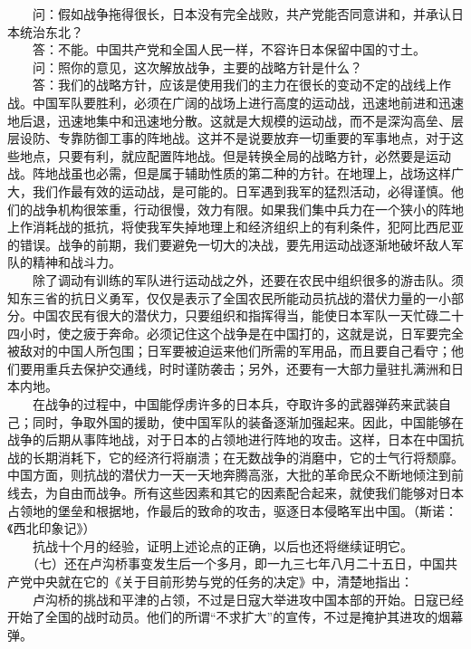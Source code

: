 \documentclass[cn,11pt,chinese]{elegantbook}
\begin{document}
　　问：假如战争拖得很长，日本没有完全战败，共产党能否同意讲和，并承认日本统治东北？\\
　　答：不能。中国共产党和全国人民一样，不容许日本保留中国的寸土。\\
　　问：照你的意见，这次解放战争，主要的战略方针是什么？\\
　　答：我们的战略方针，应该是使用我们的主力在很长的变动不定的战线上作战。中国军队要胜利，必须在广阔的战场上进行高度的运动战，迅速地前进和迅速地后退，迅速地集中和迅速地分散。这就是大规模的运动战，而不是深沟高垒、层层设防、专靠防御工事的阵地战。这并不是说要放弃一切重要的军事地点，对于这些地点，只要有利，就应配置阵地战。但是转换全局的战略方针，必然要是运动战。阵地战虽也必需，但是属于辅助性质的第二种的方针。在地理上，战场这样广大，我们作最有效的运动战，是可能的。日军遇到我军的猛烈活动，必得谨慎。他们的战争机构很笨重，行动很慢，效力有限。如果我们集中兵力在一个狭小的阵地上作消耗战的抵抗，将使我军失掉地理上和经济组织上的有利条件，犯阿比西尼亚的错误。战争的前期，我们要避免一切大的决战，要先用运动战逐渐地破坏敌人军队的精神和战斗力。\\
　　除了调动有训练的军队进行运动战之外，还要在农民中组织很多的游击队。须知东三省的抗日义勇军，仅仅是表示了全国农民所能动员抗战的潜伏力量的一小部分。中国农民有很大的潜伏力，只要组织和指挥得当，能使日本军队一天忙碌二十四小时，使之疲于奔命。必须记住这个战争是在中国打的，这就是说，日军要完全被敌对的中国人所包围；日军要被迫运来他们所需的军用品，而且要自己看守；他们要用重兵去保护交通线，时时谨防袭击；另外，还要有一大部力量驻扎满洲和日本内地。\\
　　在战争的过程中，中国能俘虏许多的日本兵，夺取许多的武器弹药来武装自己；同时，争取外国的援助，使中国军队的装备逐渐加强起来。因此，中国能够在战争的后期从事阵地战，对于日本的占领地进行阵地的攻击。这样，日本在中国抗战的长期消耗下，它的经济行将崩溃；在无数战争的消磨中，它的士气行将颓靡。中国方面，则抗战的潜伏力一天一天地奔腾高涨，大批的革命民众不断地倾注到前线去，为自由而战争。所有这些因素和其它的因素配合起来，就使我们能够对日本占领地的堡垒和根据地，作最后的致命的攻击，驱逐日本侵略军出中国。（斯诺：《西北印象记》）\\
　　抗战十个月的经验，证明上述论点的正确，以后也还将继续证明它。\\
　　（七）还在卢沟桥事变发生后一个多月，即一九三七年八月二十五日，中国共产党中央就在它的《关于目前形势与党的任务的决定》中，清楚地指出：\\
　　卢沟桥的挑战和平津的占领，不过是日寇大举进攻中国本部的开始。日寇已经开始了全国的战时动员。他们的所谓“不求扩大”的宣传，不过是掩护其进攻的烟幕弹。\\
\end{document}
